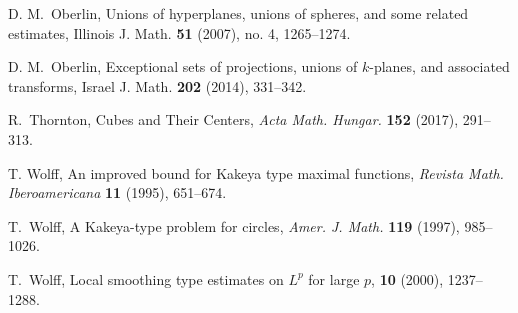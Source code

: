 \documentclass[a4paper]{amsart}
\theoremstyle{definition} \newtheorem{remark}[theorem]{Remark}
\begin{document}
\begin{thebibliography}{10}
D. M.~Oberlin, 
\newblock Unions of hyperplanes, unions of spheres, and some related estimates,
\newblock  Illinois J. Math. \textbf{51} (2007), no. 4, 1265--1274.

D. M.~Oberlin, 
\newblock Exceptional sets of projections, unions of $k$-planes, and associated transforms, 
\newblock Israel J. Math. \textbf{202} (2014), 331--342.

R.~Thornton,
\newblock Cubes and Their Centers, \textit{Acta Math. Hungar.} \textbf{152} (2017), 291--313.

T. Wolff, 
\newblock An improved bound for Kakeya type maximal functions,
\newblock \textit{Revista Math. Iberoamericana} \textbf{11} (1995), 651--674.

T.~Wolff,
\newblock A Kakeya-type problem for circles,
\newblock \emph{Amer. J. Math.} \textbf{119} (1997), 985--1026. 

T.~Wolff,
\newblock Local smoothing type estimates on {$L^p$} for large {$p$},
 \textbf{10} (2000), 1237--1288.

\end{thebibliography}
\end{document}
